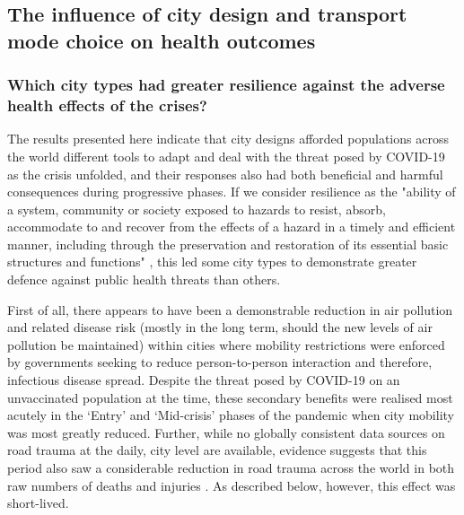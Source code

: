 \documentclass[preprint,10pt]{elsarticle} %
\begin{document}
\subsection*{The influence of city design and transport mode choice on health outcomes}
\subsubsection*{Which city types had greater resilience against the adverse health effects of the crises?}

The results presented here indicate that city designs afforded populations across the world different tools to adapt and deal with the threat posed by COVID-19 as the crisis unfolded, and their responses also had both beneficial and harmful consequences during progressive phases. If we consider resilience as the "ability of a system, community or society exposed to hazards to resist, absorb, accommodate to and recover from the effects of a hazard in a timely and efficient manner, including through the preservation and restoration of its essential basic structures and functions" \cite{unisdr2009terminology}, this led some city types to demonstrate greater defence against public health threats than others.

First of all, there appears to have been a demonstrable reduction in air pollution and related disease risk (mostly in the long term, should the new levels of air pollution be maintained) within cities where mobility restrictions were enforced by governments seeking to reduce person-to-person interaction and therefore, infectious disease spread. Despite the threat posed by COVID-19 on an unvaccinated population at the time, these secondary benefits were realised most acutely in the `Entry' and `Mid-crisis' phases of the pandemic when city mobility was most greatly reduced. Further, while no globally consistent data sources on road trauma at the daily, city level are available, evidence suggests that this period also saw a considerable reduction in road trauma across the world in both raw numbers of deaths and injuries \cite{saladie2023back,ITFRS2022,ITFRS2023,GBDStudy}. As described below, however, this effect was short-lived.
\end{document}
